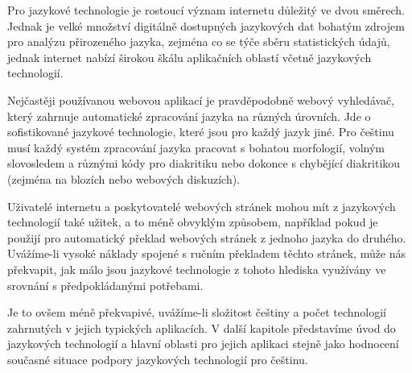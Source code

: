 \documentclass[]{../../metanetpaper}
\begin{document}
\begin{multicols}{2}
Pro jazykové technologie je rostoucí význam internetu důležitý ve dvou směrech. Jednak je velké množství digitálně dostupných jazykových dat bohatým zdrojem pro analýzu přirozeného jazyka, zejména co se týče sběru statistických údajů, jednak internet nabízí širokou škálu aplikačních oblastí včetně jazykových technologií.

Nejčastěji používanou webovou aplikací je pravděpodobně webový vyhledávač, který zahrnuje automatické zpracování jazyka na různých úrovních. Jde o sofistikované jazykové technologie, které jsou pro každý jazyk jiné. Pro češtinu musí každý systém zpracování jazyka pracovat s bohatou morfologií, volným slovosledem a různými kódy pro diakritiku nebo dokonce s chybějící diakritikou (zejména na blozích nebo webových diskuzích).

Uživatelé internetu a poskytovatelé webových stránek mohou mít z jazykových technologií také užitek, a to méně obvyklým způsobem, například pokud je použijí pro automatický překlad webových stránek z jednoho jazyka do druhého. Uvážíme-li vysoké náklady spojené s ručním překladem těchto stránek, může nás překvapit, jak málo jsou jazykové technologie z tohoto hlediska využívány ve srovnání s předpokládanými potřebami.

Je to ovšem méně překvapivé, uvážíme-li složitost češtiny a počet technologií zahrnutých v jejich typických aplikacích. V další kapitole představíme úvod do jazykových technologií a hlavní oblasti pro jejich aplikaci stejně jako hodnocení současné situace podpory jazykových technologií pro češtinu.
\end{multicols}
\clearpage
\end{document}
